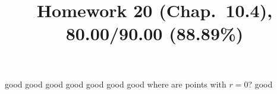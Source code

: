 \documentclass[10pt]{article} %
\title{Homework 20 (Chap.~10.4),
80.00/90.00 (88.89\%)
}
\begin{document}
\maketitle
{}
good
good
good
good
good
good
good
where are points with $r=0$?
good
\end{document}
